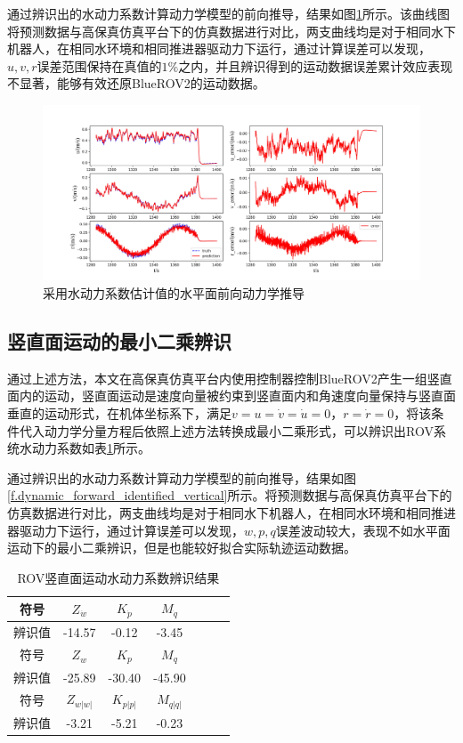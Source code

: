 通过辨识出的水动力系数计算动力学模型的前向推导，结果如图\ref{f.dynamic_forward_identified}所示。该曲线图将预测数据与高保真仿真平台下的仿真数据进行对比，两支曲线均是对于相同水下机器人，在相同水环境和相同推进器驱动力下运行，通过计算误差可以发现，$u,v,r$误差范围保持在真值的$1\%$之内，并且辨识得到的运动数据误差累计效应表现不显著，能够有效还原BlueROV2的运动数据。
\begin{figure}[hbt]
    \centering
    \includegraphics[width=\linewidth]{images/chapter3/3.1 水平面最小二乘辨识.jpg}
    \caption{采用水动力系数估计值的水平面前向动力学推导}
    \label{f.dynamic_forward_identified}
\end{figure}
\subsection{竖直面运动的最小二乘辨识}

通过上述方法，本文在高保真仿真平台内使用控制器控制BlueROV2产生一组竖直面内的运动，竖直面运动是速度向量被约束到竖直面内和角速度向量保持与竖直面垂直的运动形式，在机体坐标系下，满足$v=u=\dot{v}=\dot{u}=0$，$r=\dot{r}=0$，将该条件代入动力学分量方程后依照上述方法转换成最小二乘形式，可以辨识出ROV系统水动力系数如表\ref{t._hydro_coff_ident_vertical}所示。

通过辨识出的水动力系数计算动力学模型的前向推导，结果如图\ref{f.dynamic_forward_identified_vertical}所示。将预测数据与高保真仿真平台下的仿真数据进行对比，两支曲线均是对于相同水下机器人，在相同水环境和相同推进器驱动力下运行，通过计算误差可以发现，$w,p,q$误差波动较大，表现不如水平面运动下的最小二乘辨识，但是也能较好拟合实际轨迹运动数据。

\begin{table}[htb]
  \centering
  \caption{ROV竖直面运动水动力系数辨识结果}
  \label{t._hydro_coff_ident_vertical}
  \begin{tabular}{ccccccc}
  \hline
符号 & $Z_{\dot{w}}$ & $K_{\dot{p}}$ & $M_{\dot{q}}$ \\
\hline
辨识值  & -14.57   & -0.12  &   -3.45         \\
\hline
\hline
符号 & $Z_w$         & $K_p$            & $M_q$         \\
\hline
辨识值  & -25.89         & -30.40       & -45.90         \\
\hline
\hline
符号 & $Z_{w|w|}$    & $K_{p|p|}$     & $M_{q|q|}$    \\
\hline
辨识值  & -3.21        & -5.21        & -0.23 \\  
\hline
\end{tabular}
\end{table}

